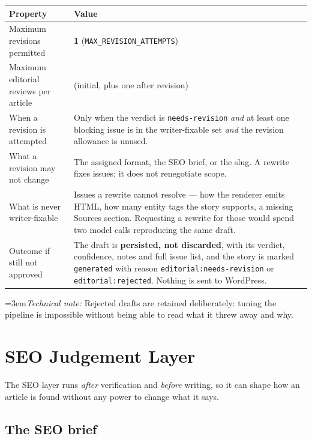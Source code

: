 \documentclass[11pt,a4paper]{article}
\newcommand{\brk}{\hyphenpenalty=0\exhyphenpenalty=0\relax}
\newcommand{\code}[1]{\texttt{\small\brk #1}}
\newcommand{\technote}[1]{\par\vspace{-0.25em}\begingroup\footnotesize\color{aitkGray}\sloppy\emergencystretch=3em\textit{Technical note:} #1\par\endgroup}
\begin{document}
\begin{center}
\small
\begin{tabularx}{\textwidth}{@{}p{5.2cm} >{\RaggedRight}X@{}}
\toprule
\textbf{Property} & \textbf{Value} \\
\midrule
Maximum revisions permitted & \textbf{1} (\code{MAX\_REVISION\_ATTEMPTS}) \\
Maximum editorial reviews per article & 2 (initial, plus one after revision) \\
When a revision is attempted & Only when the verdict is \code{needs-revision}
  \emph{and} at least one blocking issue is in the writer-fixable set \emph{and}
  the revision allowance is unused. \\
What a revision may not change & The assigned format, the SEO brief, or the slug.
  A rewrite fixes issues; it does not renegotiate scope. \\
What is never writer-fixable & Issues a rewrite cannot resolve --- how the
  renderer emits HTML, how many entity tags the story supports, a missing Sources
  section. Requesting a rewrite for those would spend two model calls reproducing
  the same draft. \\
Outcome if still not approved & The draft is \textbf{persisted, not discarded},
  with its verdict, confidence, notes and full issue list, and the story is marked
  \code{generated} with reason \code{editorial:}\allowbreak\code{needs-revision} or
  \code{editorial:rejected}. Nothing is sent to WordPress. \\
\bottomrule
\end{tabularx}
\end{center}

\technote{Rejected drafts are retained deliberately: tuning the pipeline is
impossible without being able to read what it threw away and why.}

\section{SEO Judgement Layer}

The SEO layer runs \emph{after} verification and \emph{before} writing, so it can
shape how an article is found without any power to change what it says.

\subsection{The SEO brief}
\end{document}
